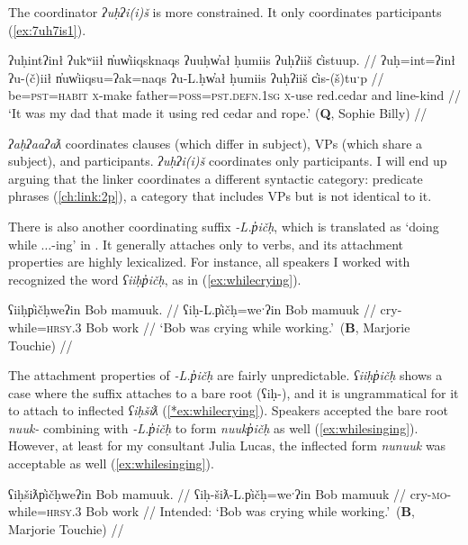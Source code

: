 The coordinator \textit{ʔuḥʔi(i)š} is more constrained. It only coordinates participants (\ref{ex:7uh7is1}).

\ex \label{ex:7uh7is1}
\begingl
\glpreamble ʔuḥintʔinł ʔukʷiił n̓uw̓iiqsknaqs ʔuuḥw̓ał ḥumiis ʔuḥʔiiš c̓istuup. //
\gla ʔuḥ=int=ʔinł ʔu-(č)iił n̓uw̓iiqsu=ʔak=naqs ʔu-L.ḥw̓ał ḥumiis ʔuḥʔiiš c̓is-(š)tuˑp //
\glb be=\textsc{pst}=\textsc{habit} \textsc{x}-make father=\textsc{poss}=\textsc{pst.defn.1sg} \textsc{x}-use red.cedar and line-kind //
\glft `It was my dad that made it using red cedar and rope.' (\textbf{Q}, Sophie Billy) //
\endgl
\xe

\textit{ʔaḥʔaaʔaƛ} coordinates clauses (which differ in subject), VPs (which share a subject), and participants. \textit{ʔuḥʔi(i)š} coordinates only participants. I will end up arguing that the linker coordinates a different syntactic category: predicate phrases (\ref{ch:link:2p}), a category that includes VPs but is not identical to it.

There is also another coordinating suffix \textit{-L.p̓ičḥ}, which is translated as `doing while $\ldots$-ing' in \cite{sapir1939}. It generally attaches only to verbs, and its attachment properties are highly lexicalized. For instance, all speakers I worked with recognized the word \textit{ʕiiḥp̓ičḥ}, as in (\ref{ex:whilecrying}).

\ex \label{ex:whilecrying}
\begingl
\glpreamble ʕiiḥp̓ičḥweʔin Bob mamuuk. //
\gla ʕiḥ-L.p̓ičḥ=weˑʔin Bob mamuuk //
\glb cry-while=\textsc{hrsy.3} Bob work //
\glft `Bob was crying while working.'\footnotemark{}\ (\textbf{B}, Marjorie Touchie) //
\endgl
\xe


The attachment properties of \textit{-L.p̓ičḥ} are fairly unpredictable. \textit{ʕiiḥp̓ičḥ} shows a case where the suffix attaches to a bare root (ʕiḥ-), and it is ungrammatical for it to attach to inflected \textit{ʕiḥšiƛ} (\ref{*ex:whilecrying}). Speakers accepted the bare root \textit{nuuk-} combining with \textit{-L.p̓ičḥ} to form \textit{nuukp̓ičḥ} as well (\ref{ex:whilesinging}). However, at least for my consultant Julia Lucas, the inflected form \textit{nunuuk} was acceptable as well (\ref{ex:whilesinging}).

\ex \label{*ex:whilecrying}
\begingl
\glpreamble *ʕiḥšiƛp̓ičḥweʔin Bob mamuuk. //
\gla ʕiḥ-šiƛ-L.p̓ičḥ=weˑʔin Bob mamuuk //
\glb cry-\textsc{mo}-while=\textsc{hrsy.3} Bob work //
\glft Intended: `Bob was crying while working.'\footnotemark{}\ (\textbf{B}, Marjorie Touchie) //
\endgl
\xe

